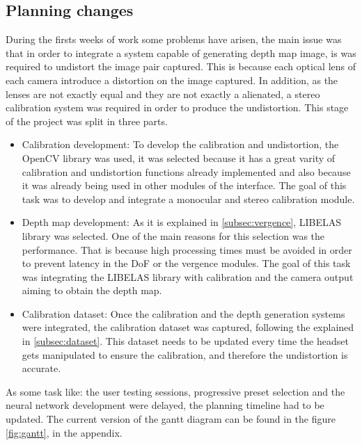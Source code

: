 \documentclass[10pt,a4paper,twocolumn,twoside]{article}
\begin{document}
	\subsection{Planning changes}
		
	During the firsts weeks of work some problems have arisen, the main issue was that in order to integrate a system capable of generating depth map image, is was required to undistort the image pair captured. This is because each optical lens of each camera introduce a distortion on the image captured. In addition, as the lenses are not exactly equal and they are not exactly a alienated, a stereo calibration system was required in order to produce the undistortion. This stage of the project was split in three parts.
	
	\begin{itemize}
		\item Calibration development: To develop the calibration and undistortion, the OpenCV library \cite{web:opencv} was used, it was selected because it has a great varity of calibration and undistortion functions already implemented and also because it was already being used in other modules of the interface. The goal of this task was to develop and integrate a monocular and stereo calibration module.
		
		\item Depth map development: As it is explained in \ref{subsec:vergence}, LIBELAS library was selected. One of the main reasons for this selection was the performance. That is because high processing times must be avoided in order to prevent latency in the DoF or the vergence modules. The goal of this task was integrating the LIBELAS library with calibration and the camera output aiming to obtain the depth map. 
		
		\item Calibration dataset: Once the calibration and the depth generation systems were integrated, the calibration dataset was captured, following the explained in \ref{subsec:dataset}. This dataset needs to be updated every time the headset gets manipulated to ensure the calibration, and therefore the undistortion is accurate.
	\end{itemize}

	As some task like: the user testing sessions, progressive preset selection and the neural network development were delayed, the planning timeline had to be updated. The current version of the gantt diagram can be found in the figure \ref{fig:gantt}, in the appendix.
	
\end{document}
